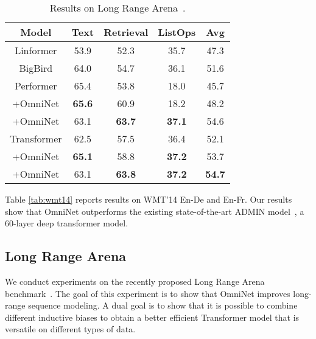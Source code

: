 \documentclass{article}
\begin{document}
\begin{table}[t!]
    \vspace{-5pt}
    \centering
    \caption{Results on Long Range Arena~\citep{tay2020long}.}
    \begin{tabular}{c|ccc|c}
    \toprule
       Model  & Text & Retrieval & ListOps &  Avg \\
       \midrule
       Linformer & 53.9 & 52.3 & 35.7 & 47.3 \\
       BigBird &  64.0 & 54.7 & 36.1 & 51.6 \\
       \midrule
       Performer & 65.4& 53.8 & 18.0 &  45.7  \\
       +OmniNet & \textbf{65.6} & 60.9 &  18.2 & 48.2\\
       +OmniNet & 63.1 & \textbf{63.7} & \textbf{37.1} & 54.6 \\ 
       \midrule
       Transformer  & 62.5 & 57.5 & 36.4 & 52.1 \\ 
       +OmniNet & \textbf{65.1} & 58.8 & \textbf{37.2} & 53.7 \\
       +OmniNet & 63.1 & \textbf{63.8} &\textbf{37.2} & \textbf{54.7} \\ 
       \bottomrule
    \end{tabular}
    \label{tab:lra_results}
    \vspace{-22pt}
\end{table}
Table \ref{tab:wmt14} reports results on WMT'14 En-De and En-Fr. Our results show that OmniNet outperforms the existing state-of-the-art ADMIN model~\citep{liu2020very}, a 60-layer deep transformer model. 
\subsection{Long Range Arena}
We conduct experiments on the recently proposed Long Range Arena benchmark~\citep{tay2020long}. The goal of this experiment is to show that OmniNet improves long-range sequence modeling. A dual goal is  to show that it is possible to combine different inductive biases to obtain a better efficient Transformer model that is versatile on different types of data.
\end{document}
